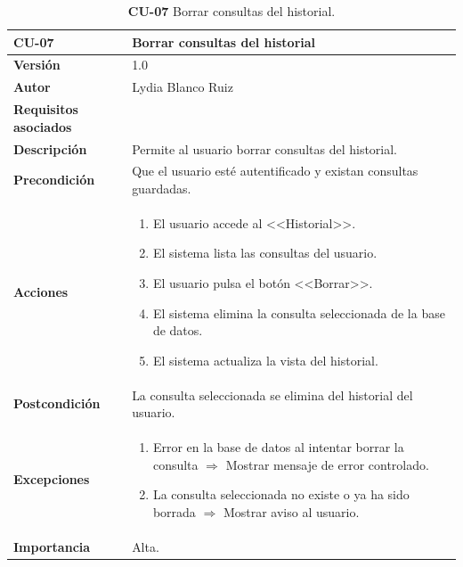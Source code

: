 \begin{table}[p]
	\centering
	\begin{tabularx}{\linewidth}{ p{} p{} }
		\toprule
		\textbf{\textbf{CU-07}}    & \textbf{Borrar consultas del historial}\\
		\toprule
		\textbf{Versión}              & 1.0    \\
		\textbf{Autor}                & Lydia Blanco Ruiz \\
		\textbf{Requisitos asociados} & {RF-11.2} \\
		\textbf{Descripción}          & Permite al usuario borrar consultas del historial. \\
		\textbf{Precondición}         & Que el usuario esté autentificado y existan consultas guardadas. \\
		\textbf{Acciones}             &
		\begin{enumerate}
			\def\labelenumi{\arabic{enumi}.}
			\tightlist
			\item El usuario accede al <<Historial>>.
			\item El sistema lista las consultas del usuario.
			\item El usuario pulsa el botón <<Borrar>>.
			\item El sistema elimina la consulta seleccionada de la base de datos.
			\item El sistema actualiza la vista del historial.
		\end{enumerate}\\
		\textbf{Postcondición}        & La consulta seleccionada se elimina del historial del usuario. \\
		\textbf{Excepciones}          & 
		\begin{enumerate}
			\def\labelenumi{\arabic{enumi}.}
			\tightlist
			\item Error en la base de datos al intentar borrar la consulta $\Rightarrow$ Mostrar mensaje de error controlado.
			\item La consulta seleccionada no existe o ya ha sido borrada $\Rightarrow$ Mostrar aviso al usuario.
		\end{enumerate}\\
		\textbf{Importancia}          & Alta.  \\
		\bottomrule
	\end{tabularx}
	\caption{\textbf{CU-07} Borrar consultas del historial.}
	\label{req-07}
\end{table}

